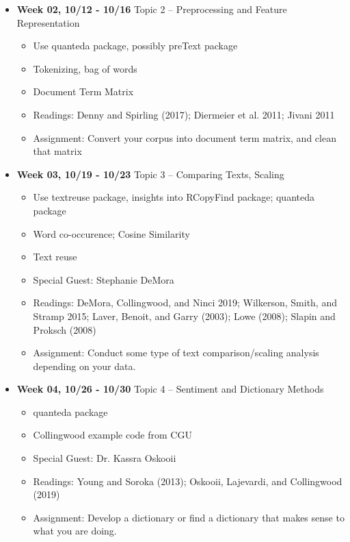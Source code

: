 \documentclass[11pt]{article}
\begin{document}
\begin{itemize}
	\item \textbf{Week 02, 10/12 - 10/16} Topic 2 -- Preprocessing and Feature Representation
	\begin{itemize}
	\item Use quanteda package, possibly preText package
	\item Tokenizing, bag of words
	\item Document Term Matrix
	\item Readings: Denny and Spirling (2017); Diermeier et al. 2011; Jivani 2011
	\item Assignment: Convert your corpus into document term matrix, and clean that matrix
	\end{itemize}
\end{itemize}

\begin{itemize}
	\item \textbf{Week 03, 10/19 - 10/23} Topic 3 -- Comparing Texts, Scaling
	\begin{itemize}
	\item Use textreuse package, insights into RCopyFind package; quanteda package
	\item Word co-occurence; Cosine Similarity
	\item Text reuse
	\item Special Guest: Stephanie DeMora
	\item Readings: DeMora, Collingwood, and Ninci 2019; Wilkerson, Smith, and Stramp 2015; Laver, Benoit, and Garry (2003); Lowe (2008); Slapin and Proksch (2008)
	\item Assignment: Conduct some type of text comparison/scaling analysis depending on your data. 
	\end{itemize}
\end{itemize}

\begin{itemize}
	\item \textbf{Week 04, 10/26 - 10/30} Topic 4 --  Sentiment and Dictionary Methods
	\begin{itemize}
	\item quanteda package
	\item Collingwood example code from CGU
	\item Special Guest: Dr. Kassra Oskooii
	\item Readings: Young and Soroka (2013); Oskooii, Lajevardi, and Collingwood (2019)
	\item Assignment: Develop a dictionary or find a dictionary that makes sense to what you are doing.
	\end{itemize}
\end{itemize}
\end{document}
